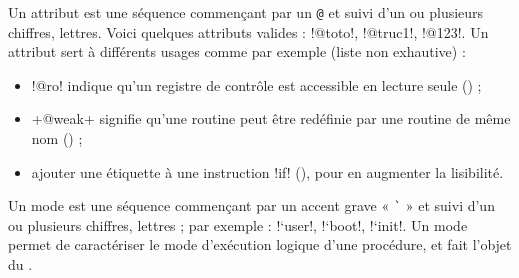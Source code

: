 











Un attribut est une séquence commençant par un \texttt{@} et suivi d'un ou plusieurs chiffres, lettres. Voici quelques attributs valides : \plm!@toto!, \plm!@truc1!, \plm!@123!. Un attribut sert à différents usages comme par exemple (liste non exhautive) :
\begin{itemize}
  \item \plm!@ro! indique qu'un registre de contrôle est accessible en lecture seule () ;
  \item \plm+@weak+ signifie qu'une routine peut être redéfinie par une routine de même nom () ;
  \item ajouter une étiquette à une instruction \plm!if! (), pour en augmenter la lisibilité.
\end{itemize}









Un mode est une séquence commençant par un accent grave « \texttt{\`} » et suivi d'un ou plusieurs chiffres, lettres ; par exemple : \plm!`user!, \plm!`boot!, \plm!`init!. Un mode permet de caractériser le mode d'exécution logique d'une procédure, et fait l'objet du .









